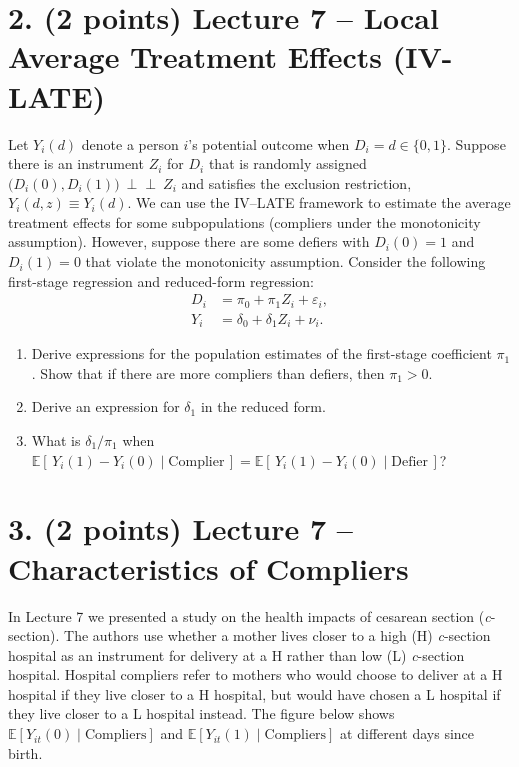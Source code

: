 \documentclass[12pt]{article}
\begin{document}
\newpage

\section*{2. (2 points) Lecture 7 -- Local Average Treatment Effects (IV-LATE)}
Let $Y_i(d)$ denote a person $i$'s potential outcome when $D_i=d\in\{0,1\}$. Suppose there is an instrument $Z_i$ for $D_i$ that is randomly assigned $\big(D_i(0),D_i(1)\big)\ \perp\!\!\!\perp\ Z_i$ and satisfies the exclusion restriction, $Y_i(d,z)\equiv Y_i(d)$. We can use the IV--LATE framework to estimate the average treatment effects for some subpopulations (compliers under the monotonicity assumption). However, suppose there are some defiers with $D_i(0)=1$ and $D_i(1)=0$ that violate the monotonicity assumption. Consider the following first-stage regression and reduced-form regression:
\begin{align*}
  D_i &= \pi_0 + \pi_1 Z_i + \varepsilon_i,\\
  Y_i &= \delta_0 + \delta_1 Z_i + \nu_i.
\end{align*}

\begin{enumerate}[label=\textbf{(\alph*)}, leftmargin=1.5em]
  \item Derive expressions for the population estimates of the first-stage coefficient $\pi_1$. Show that if there are more compliers than defiers, then $\pi_1>0$.\\[0.5em]
  \newpage

  \item Derive an expression for $\delta_1$ in the reduced form.\\[0.5em]
  \newpage

  \item What is $\delta_1/\pi_1$ when $\mathbb{E}[\,Y_i(1)-Y_i(0)\mid\text{Complier}\,]=\mathbb{E}[\,Y_i(1)-Y_i(0)\mid\text{Defier}\,]$?\\[0.5em]
  \newpage
\end{enumerate}

\newpage

\section*{3. (2 points) Lecture 7 -- Characteristics of Compliers}
In Lecture 7 we presented a study on the health impacts of cesarean section (\emph{c}-section). The authors use whether a mother lives closer to a high (H) \emph{c}-section hospital as an instrument for delivery at a H rather than low (L) \emph{c}-section hospital. Hospital compliers refer to mothers who would choose to deliver at a H hospital if they live closer to a H hospital, but would have chosen a L hospital if they live closer to a L hospital instead. The figure below shows $\mathbb{E}[Y_{it}(0)\mid\text{Compliers}]$ and $\mathbb{E}[Y_{it}(1)\mid\text{Compliers}]$ at different days since birth.
\end{document}
